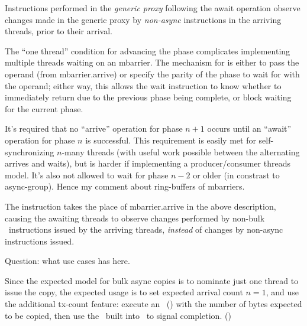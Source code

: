 \filbreak
Instructions performed in the \textit{generic proxy} following the await operation observe changes made in the generic proxy by \textit{non-async} instructions in the arriving threads, prior to their arrival.

The ``one thread'' condition for advancing the phase complicates implementing multiple threads waiting on an mbarrier. The mechanism for  is either to pass the  operand (from mbarrier.arrive) or specify the parity of the phase to wait for with the  operand; either way, this allows the wait instruction to know whether to immediately return due to the previous phase being complete, or block waiting for the current phase.

It's required that no ``arrive'' operation for phase $n+1$ occurs until an ``await'' operation for phase $n$ is successful.
This requirement is easily met for self-synchronizing $n$-many threads (with useful work possible between the alternating arrives and waits), but is harder if implementing a producer/consumer threads model.
It's also not allowed to wait for phase $n-2$ or older (in constrast to async-group).
Hence my comment about ring-buffers of mbarriers.

\filbreak
{} The  instruction takes the place of mbarrier.arrive in the above description, causing the awaiting threads to observe changes performed by non-bulk \cpAsync\ instructions issued by the arriving threads, \textit{instead} of changes by non-async instructions issued.

Question: what use cases  has here.

\filbreak
{} Since the expected model for bulk async copies is to nominate just one thread to issue the copy, the expected usage is to set expected arrival count $n = 1$, and use the additional tx-count feature: execute an \expectTxOperation\ () with the number of bytes expected to be copied, then use the \completeTxOperation\ built into \cpAsyncBulk\ to signal completion. ()

